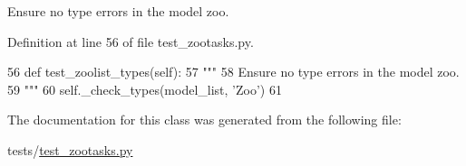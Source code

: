 \begin{DoxyVerb}Ensure no type errors in the model zoo.
\end{DoxyVerb}
 

Definition at line 56 of file test\+\_\+zootasks.\+py.


\begin{DoxyCode}
56     \textcolor{keyword}{def }test\_zoolist\_types(self):
57         \textcolor{stringliteral}{"""}
58 \textcolor{stringliteral}{        Ensure no type errors in the model zoo.}
59 \textcolor{stringliteral}{        """}
60         self.\_check\_types(model\_list, \textcolor{stringliteral}{'Zoo'})
61 
\end{DoxyCode}


The documentation for this class was generated from the following file\+:\begin{DoxyCompactItemize}
\item 
tests/\hyperlink{test__zootasks_8py}{test\+\_\+zootasks.\+py}\end{DoxyCompactItemize}
